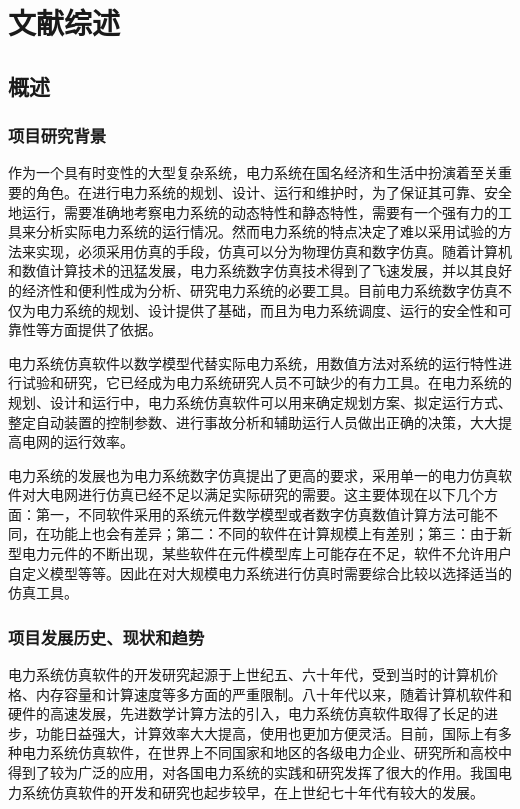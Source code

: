 \chapter{文献综述}

\section{概述}

\subsection{项目研究背景}

作为一个具有时变性的大型复杂系统，电力系统在国名经济和生活中扮演着至关重要的角色。在进行电力系统的规划、设计、运行和维护时，为了保证其可靠、安全地运行，需要准确地考察电力系统的动态特性和静态特性，需要有一个强有力的工具来分析实际电力系统的运行情况。然而电力系统的特点决定了难以采用试验的方法来实现，必须采用仿真的手段，仿真可以分为物理仿真和数字仿真。随着计算机和数值计算技术的迅猛发展，电力系统数字仿真技术得到了飞速发展，并以其良好的经济性和便利性成为分析、研究电力系统的必要工具。目前电力系统数字仿真不仅为电力系统的规划、设计提供了基础，而且为电力系统调度、运行的安全性和可靠性等方面提供了依据。

电力系统仿真软件以数学模型代替实际电力系统，用数值方法对系统的运行特性进行试验和研究，它已经成为电力系统研究人员不可缺少的有力工具。在电力系统的规划、设计和运行中，电力系统仿真软件可以用来确定规划方案、拟定运行方式、整定自动装置的控制参数、进行事故分析和辅助运行人员做出正确的决策，大大提高电网的运行效率。

电力系统的发展也为电力系统数字仿真提出了更高的要求，采用单一的电力仿真软件对大电网进行仿真已经不足以满足实际研究的需要。这主要体现在以下几个方面：第一，不同软件采用的系统元件数学模型或者数字仿真数值计算方法可能不同，在功能上也会有差异；第二：不同的软件在计算规模上有差别；第三：由于新型电力元件的不断出现，某些软件在元件模型库上可能存在不足，软件不允许用户自定义模型等等。因此在对大规模电力系统进行仿真时需要综合比较以选择适当的仿真工具。

\subsection{项目发展历史、现状和趋势}

电力系统仿真软件的开发研究起源于上世纪五、六十年代，受到当时的计算机价格、内存容量和计算速度等多方面的严重限制。八十年代以来，随着计算机软件和硬件的高速发展，先进数学计算方法的引入，电力系统仿真软件取得了长足的进步，功能日益强大，计算效率大大提高，使用也更加方便灵活。目前，国际上有多种电力系统仿真软件，在世界上不同国家和地区的各级电力企业、研究所和高校中得到了较为广泛的应用，对各国电力系统的实践和研究发挥了很大的作用。我国电力系统仿真软件的开发和研究也起步较早，在上世纪七十年代有较大的发展。

